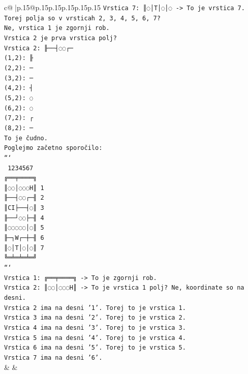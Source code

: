\documentclass{article}
\begin{document}
{\begin{supertabular}{c@{$\;$}|p{.15\linewidth}@{}p{.15\linewidth}p{.15\linewidth}p{.15\linewidth}p{.15\linewidth}p{.15\linewidth}}
{{{\texttt{Vrstica 7: ║◌│T│◌│◌ {-}> To je vrstica 7.} \\
\texttt{Torej polja so v vrsticah 2, 3, 4, 5, 6, 7?} \\
\texttt{Ne, vrstica 1 je zgornji rob.} \\
\texttt{Vrstica 2 je prva vrstica polj?} \\
\texttt{Vrstica 2: ╟──┤◌◌┌─} \\
\texttt{(1,2): ╟} \\
\texttt{(2,2): ─} \\
\texttt{(3,2): ─} \\
\texttt{(4,2): ┤} \\
\texttt{(5,2): ◌} \\
\texttt{(6,2): ◌} \\
\texttt{(7,2): ┌} \\
\texttt{(8,2): ─} \\
\texttt{To je čudno.} \\
\texttt{Poglejmo začetno sporočilo:} \\
\texttt{```} \\
\texttt{ 1234567} \\
\texttt{╔══╤════╗} \\
\texttt{║◌◌│◌◌◌H║ 1} \\
\texttt{╟──┤◌◌┌─╢ 2} \\
\texttt{║CI├──┤◌║ 3} \\
\texttt{╟──┘◌◌├─╢ 4} \\
\texttt{║◌◌◌◌◌│◌║ 5} \\
\texttt{╟─┐W┌─┼─╢ 6} \\
\texttt{║◌│T│◌│◌║ 7} \\
\texttt{╚═╧═╧═╧═╝} \\
\texttt{```} \\
\texttt{Vrstica 1: ╔══╤════╗ {-}> To je zgornji rob.} \\
\texttt{Vrstica 2: ║◌◌│◌◌◌H║ {-}> To je vrstica 1 polj? Ne, koordinate so na desni.} \\
\texttt{Vrstica 2 ima na desni '1'. Torej to je vrstica 1.} \\
\texttt{Vrstica 3 ima na desni '2'. Torej to je vrstica 2.} \\
\texttt{Vrstica 4 ima na desni '3'. Torej to je vrstica 3.} \\
\texttt{Vrstica 5 ima na desni '4'. Torej to je vrstica 4.} \\
\texttt{Vrstica 6 ima na desni '5'. Torej to je vrstica 5.} \\
\texttt{Vrstica 7 ima na desni '6'.} \\
            }
        }
    }
    & & \\ \\


\end{supertabular}}
\end{document}
